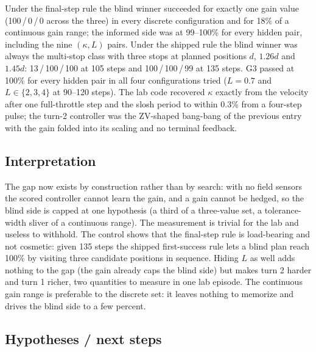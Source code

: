 \documentclass[11pt,a4paper]{article}
\begin{document}
Under the final-step rule the blind winner succeeded for exactly one gain
value (100\,/\,0\,/\,0 across the three) in every discrete configuration and
for 18\% of a continuous gain range; the informed side was at 99--100\% for
every hidden pair, including the nine $(\kappa, L)$ pairs. Under the shipped
rule the blind winner was always the multi-stop class with three stops at
planned positions $d$, $1.26d$ and $1.45d$: 13\,/\,100\,/\,100 at 105 steps
and 100\,/\,100\,/\,99 at 135 steps. G3 passed at 100\% for every hidden pair
in all four configurations tried ($L=0.7$ and $L\in\{2,3,4\}$ at 90--120
steps). The lab code recovered $\kappa$ exactly from the velocity after one
full-throttle step and the slosh period to within 0.3\% from a four-step
pulse; the turn-2 controller was the ZV-shaped bang-bang of the previous entry
with the gain folded into its scaling and no terminal feedback.

\subsection*{Interpretation}

The gap now exists by construction rather than by search: with no field
sensors the scored controller cannot learn the gain, and a gain cannot be
hedged, so the blind side is capped at one hypothesis (a third of a
three-value set, a tolerance-width sliver of a continuous range). The
measurement is trivial for the lab and useless to withhold. The control
shows that the final-step rule is load-bearing and not cosmetic: given 135
steps the shipped first-success rule lets a blind plan reach 100\% by visiting
three candidate positions in sequence. Hiding $L$ as well adds nothing to the
gap (the gain already caps the blind side) but makes turn 2 harder and turn 1
richer, two quantities to measure in one lab episode. The continuous gain
range is preferable to the discrete set: it leaves nothing to memorize and
drives the blind side to a few percent.

\subsection*{Hypotheses / next steps}
\end{document}
